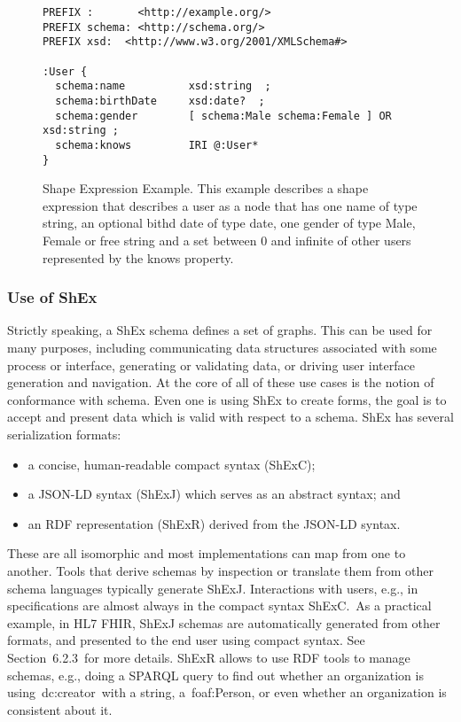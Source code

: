 \begin{figure}[hb]
\begin{lstlisting}
PREFIX :       <http://example.org/>
PREFIX schema: <http://schema.org/>
PREFIX xsd:  <http://www.w3.org/2001/XMLSchema#>

:User {
  schema:name          xsd:string  ;
  schema:birthDate     xsd:date?  ;
  schema:gender        [ schema:Male schema:Female ] OR xsd:string ;
  schema:knows         IRI @:User*
}
\end{lstlisting}
\caption[Shape Expression Example]{Shape Expression Example. This example describes a shape expression that describes a user as a node that has one name of type string, an optional bithd date of type date, one gender of type Male, Female or free string and a set between 0 and infinite of other users represented by the knows property.}
\end{figure}

\subsubsection{Use of ShEx}
Strictly speaking, a ShEx schema defines a set of graphs. This can be used for many purposes, including communicating data structures associated with some process or interface, generating or validating data, or driving user interface generation and navigation. At the core of all of these use cases is the notion of conformance with schema. Even one is using ShEx to create forms, the goal is to accept and present data which is valid with respect to a schema.
ShEx has several serialization formats:

\begin{itemize}
	\item a concise, human-readable compact syntax (ShExC);
	\item a JSON-LD syntax (ShExJ) which serves as an abstract syntax; and
	\item an RDF representation (ShExR) derived from the JSON-LD syntax.
\end{itemize}

These are all isomorphic and most implementations can map from one to another.
Tools that derive schemas by inspection or translate them from other schema languages typically generate ShExJ. Interactions with users, e.g., in specifications are almost always in the compact syntax ShExC. As a practical example, in HL7 FHIR, ShExJ schemas are automatically generated from other formats, and presented to the end user using compact syntax. See Section 6.2.3 for more details.
ShExR allows to use RDF tools to manage schemas, e.g., doing a SPARQL query to find out whether an organization is using dc:creator with a string, a foaf:Person, or even whether an organization is consistent about it.

